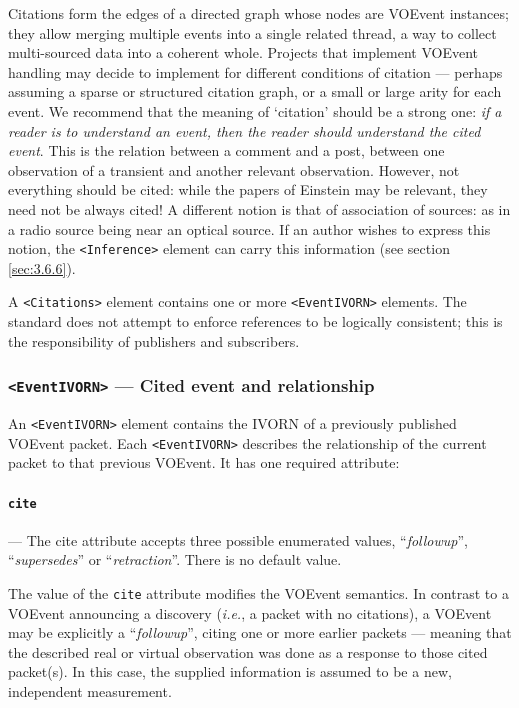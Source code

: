 \documentclass[11pt,a4paper]{ivoa}
\begin{document}
Citations form the edges of a directed graph whose nodes are VOEvent instances; 
they allow merging multiple events into a single related thread, a way to 
collect multi-sourced data into a coherent whole. Projects that implement 
VOEvent handling may decide to implement for different conditions of citation 
--- perhaps assuming a sparse or structured citation graph, or a small or large 
arity for each event. We recommend that the meaning of `citation' should be a 
strong one: \emph{if a reader is to understand an event, then the reader should 
understand the cited event}. This is the relation between a comment and a post, 
between one observation of a transient and another relevant observation. 
However, not everything should be cited: while the papers of Einstein may be 
relevant, they need not be always cited! A different notion is that of 
association of sources: as in a radio source being near an optical source. If an
author wishes to express this notion, the {\tt <Inference>} element can carry 
this information (see section \ref{sec:3.6.6}). 

A {\tt <Citations>} element contains one or more {\tt <EventIVORN>} elements. 
The standard does not attempt to enforce references to be logically consistent; 
this is the responsibility of publishers and subscribers. 

\subsubsection{{\tt <EventIVORN>} --- Cited event and relationship}
\label{sec:3.7.1}
An {\tt <EventIVORN>} element contains the IVORN of a previously published 
VOEvent packet. Each {\tt <EventIVORN>} describes the relationship of the 
current packet to that previous VOEvent. It has one required attribute: 

\paragraph{\tt cite}\label{sec:3.7.1.1} --- The {cite} attribute accepts three 
possible enumerated values, ``\emph{followup}'', ``\emph{supersedes}'' or 
``\emph{retraction}''. There is no default value. 

The value of the {\tt cite} attribute modifies the VOEvent semantics. In 
contrast to a VOEvent announcing a discovery (\emph{i.e.}, a packet with no 
citations), a VOEvent may be explicitly a ``\emph{followup}'', citing one or 
more earlier packets --- meaning that the described real or virtual observation 
was done as a response to those cited packet(s). In this case, the supplied 
information is assumed to be a new, independent measurement. 
\end{document}
